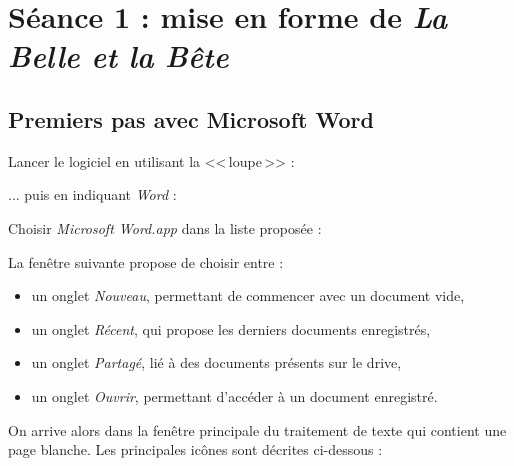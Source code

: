 \newpage





%
%
%
%




\section{Séance 1 : mise en forme de \emph{La Belle et la Bête}}

\subsection{Premiers pas avec Microsoft Word}

Lancer le logiciel en utilisant la <<\,loupe\,>> :


... puis en indiquant \emph{Word} :


Choisir \emph{Microsoft Word.app} dans la liste proposée :


La fenêtre suivante propose de choisir entre :
\begin{itemize}
\item un onglet \emph{Nouveau}, permettant de commencer avec un document vide,
\item un onglet \emph{Récent}, qui propose les derniers documents enregistrés,
\item un onglet \emph{Partagé}, lié à des documents présents sur le drive,
\item un onglet \emph{Ouvrir}, permettant d'accéder à un document enregistré.
\end{itemize}


On arrive alors dans la fenêtre principale du traitement de texte qui contient une page blanche. Les principales icônes sont décrites ci-dessous :







